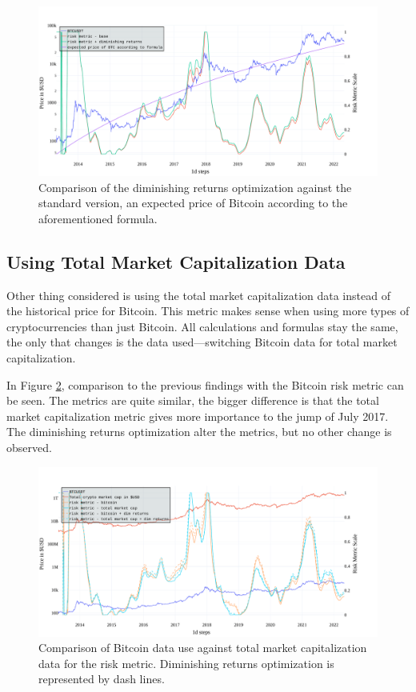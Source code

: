 \begin{figure}[!hbt]
    \centering
    \includegraphics[width=\columnwidth]{figures/riskmetric-dim-returns.pdf}
    \caption{Comparison of the diminishing returns optimization against the standard version, an expected price of Bitcoin according to the aforementioned formula.}
    \label{figure-dim-riskmetric}
\end{figure}

\subsection*{Using Total Market Capitalization Data}
\label{subsection-marketcap}
Other thing considered is using the total market capitalization data instead of the historical price for Bitcoin. This metric makes sense when using more types of cryptocurrencies than just Bitcoin. All calculations and formulas stay the same, the only that changes is the data used---switching Bitcoin data for total market capitalization.

In Figure \ref{figure-total-marketcap-riskmetric}, comparison to the previous findings with the Bitcoin risk metric can be seen. The metrics are quite similar, the bigger difference is that the total market capitalization metric gives more importance to the jump of July 2017. The diminishing returns optimization alter the metrics, but no other change is observed.

\begin{figure}[!hbt]
    \centering
    \includegraphics[width=\columnwidth]{figures/totalmarketcap-metric.pdf}
    \caption{Comparison of Bitcoin data use against total market capitalization data for the risk metric. Diminishing returns optimization is represented by dash lines.}
    \label{figure-total-marketcap-riskmetric}
\end{figure}



